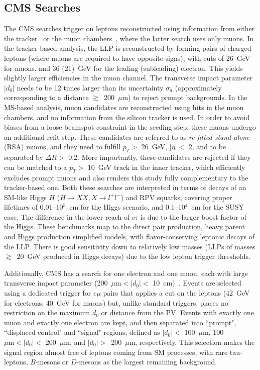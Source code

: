 \subsection{CMS Searches}
\label{sec:CMSleptonic}

The CMS searches trigger on leptons reconstructed using information from either the tracker~\cite{CMS:2014hka} or the muon chambers~\cite{CMS:2015pca}, where the latter search uses only muons. In the tracker-based analysis, the LLP is reconstructed by forming pairs of charged leptons (where muons are required to have opposite signs), with \pT cuts of 26~GeV for muons, and 36 (21)~GeV for the leading (subleading) electron. This yields slightly larger efficiencies in the muon channel. The transverse impact parameter $|d_0|$ needs to be 12 times larger than its uncertainty $\sigma_d$ (approximately corresponding to a distance $\gtrsim$~200~$\mu\mathrm{m}$) to reject prompt backgrounds. In the MS-based analysis, muon candidates are reconstructed using hits in the muon chambers, and no information from the silicon tracker is used. In order to avoid biases from a loose beamspot constraint in the seeding step, these muons undergo an additional refit step. These candidates are referred to as \emph{re-fitted stand-alone} (RSA) muons, and they need to fulfill $p_T >$ 26~GeV, $|\eta| <$ 2, and to be separated by $\Delta R >$ 0.2. More importantly, these candidates are rejected if they can be matched to a $p_T >$ 10~GeV track in the inner tracker, which efficiently excludes prompt muons and also renders this study fully complementary to the tracker-based one. Both these searches are interpreted in terms of decays of an SM-like Higgs $H$ ($H \to XX, X \to l^+ l^-$) and RPV squarks, covering proper lifetimes of 0.01--10$^5$~cm for the Higgs scenario, and 0.1--10$^4$~cm for the SUSY case. The difference in the lower reach of $c \tau$ is due to the larger boost factor of the Higgs. These benchmarks map to the direct pair production, heavy parent and Higgs production simplified models, with flavor-conserving leptonic decays of the LLP. There is good sensitivity down to relatively low masses (LLPs of masses $\gtrsim$~20~GeV produced in Higgs decays) due to the low lepton trigger thresholds.

Additionally, CMS has a search for one electron and one muon, each with large transverse impact parameter (200~$\mu\mathrm{m} < |d_{0}| <$ 10~cm)~\cite{CMS-PAS-EXO-16-022}. Events are selected using a dedicated trigger for $e\mu$ pairs that applies a \pT cut on the leptons (42~GeV for electrons, 40~GeV for muons) but, unlike standard triggers, places no restriction on the maximum $d_{0}$ or distance from the PV. Events with exactly one muon and exactly one electron are kept, and then separated into ``prompt", ``displaced control" and ``signal" regions, defined as $|d_0| <$ 100~$\mu\mathrm{m}$, 100~$\mu\mathrm{m} < |d_0| <$ 200~$\mu\mathrm{m}$, and $|d_0| >$~200~$\mu\mathrm{m}$, respectively. This selection makes the signal region almost free of leptons coming from SM processes, with rare tau-leptons, $B$-mesons or $D$-mesons as the largest remaining background.

